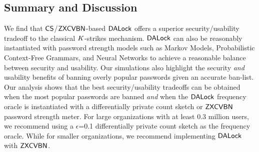 \vspace{-0.2cm}
\subsection{Summary and Discussion}\label{sec:experiment_summary}

We find that $\mathsf{CS}$/$\mathsf{ZXCVBN}$-based $\mathsf{DALock}$ offers a superior security/usability tradeoff to the classical $K$-strikes mechanism. $\mathsf{DALock}$ can also be reasonably instantiated with password strength models such as Markov Models, Probabilistic Context-Free Grammars, and Neural Networks to achieve a reasonable balance between security and usability. Our simulations also highlight the security {\em and} usability benefits of banning overly popular passwords given an accurate ban-list. Our analysis shows that the best security/usability tradeoffs can be obtained when the most popular passwords are banned \textit{and} when the $\mathsf{DALock}$ frequency oracle is instantiated with a differentially private count sketch or $\mathsf{ZXCVBN}$ password strength meter. For large organizations with at least $0.3$ million users, we recommend using a $\epsilon$=0.1 differentially private count sketch as the frequency oracle. While for smaller organizations, we recommend implementing $\mathsf{DALock}$ with $\mathsf{ZXCVBN}$. 




